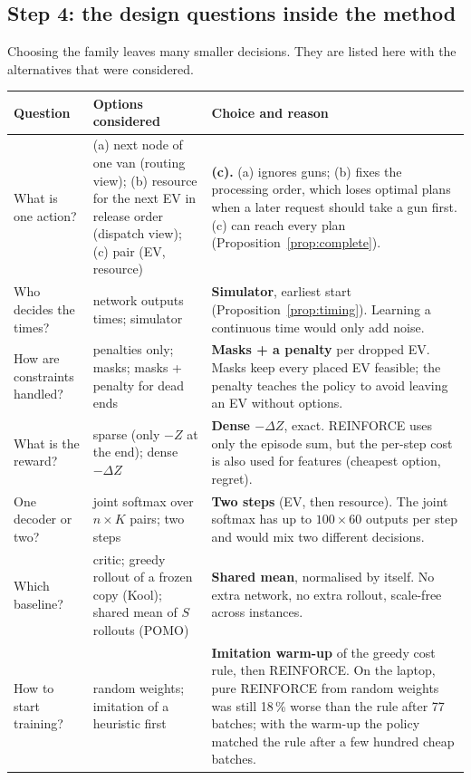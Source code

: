 \subsection{Step 4: the design questions inside the method}

Choosing the family leaves many smaller decisions. They are listed here with the alternatives that were considered.

{\small
\begin{longtable}{@{}>{\raggedright\arraybackslash}p{3.4cm}>{\raggedright\arraybackslash}p{4.4cm}>{\raggedright\arraybackslash}p{7.5cm}@{}}
\toprule
\textbf{Question} & \textbf{Options considered} & \textbf{Choice and reason} \\
\midrule
\endhead
What is one action? & (a) next node of one van (routing view); (b) resource for the next EV in release order (dispatch view); (c) pair (EV, resource) & \textbf{(c).} (a) ignores guns; (b) fixes the processing order, which loses optimal plans when a later request should take a gun first. (c) can reach every plan (Proposition~\ref{prop:complete}). \\
Who decides the times? & network outputs times; simulator & \textbf{Simulator}, earliest start (Proposition~\ref{prop:timing}). Learning a continuous time would only add noise. \\
How are constraints handled? & penalties only; masks; masks + penalty for dead ends & \textbf{Masks + a penalty} per dropped EV. Masks keep every placed EV feasible; the penalty teaches the policy to avoid leaving an EV without options. \\
What is the reward? & sparse (only $-Z$ at the end); dense $-\Delta Z$ & \textbf{Dense $-\Delta Z$}, exact. REINFORCE uses only the episode sum, but the per-step cost is also used for features (cheapest option, regret). \\
One decoder or two? & joint softmax over $n\times K$ pairs; two steps & \textbf{Two steps} (EV, then resource). The joint softmax has up to $100\times60$ outputs per step and would mix two different decisions. \\
Which baseline? & critic; greedy rollout of a frozen copy (Kool); shared mean of $S$ rollouts (POMO) & \textbf{Shared mean}, normalised by itself. No extra network, no extra rollout, scale-free across instances. \\
How to start training? & random weights; imitation of a heuristic first & \textbf{Imitation warm-up} of the greedy cost rule, then REINFORCE. On the laptop, pure REINFORCE from random weights was still 18\,\% worse than the rule after 77 batches; with the warm-up the policy matched the rule after a few hundred cheap batches. \\

\end{longtable}}
